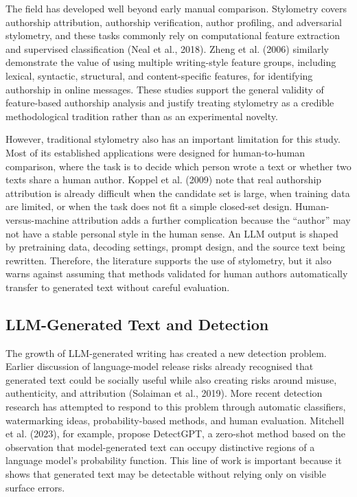 \documentclass[12pt,a4paper]{article}
\begin{document}
The field has developed well beyond early manual comparison. Stylometry covers authorship attribution, authorship verification, author profiling, and adversarial stylometry, and these tasks commonly rely on computational feature extraction and supervised classification (Neal et al., 2018). Zheng et al. (2006) similarly demonstrate the value of using multiple writing-style feature groups, including lexical, syntactic, structural, and content-specific features, for identifying authorship in online messages. These studies support the general validity of feature-based authorship analysis and justify treating stylometry as a credible methodological tradition rather than as an experimental novelty.

However, traditional stylometry also has an important limitation for this study. Most of its established applications were designed for human-to-human comparison, where the task is to decide which person wrote a text or whether two texts share a human author. Koppel et al. (2009) note that real authorship attribution is already difficult when the candidate set is large, when training data are limited, or when the task does not fit a simple closed-set design. Human-versus-machine attribution adds a further complication because the ``author'' may not have a stable personal style in the human sense. An LLM output is shaped by pretraining data, decoding settings, prompt design, and the source text being rewritten. Therefore, the literature supports the use of stylometry, but it also warns against assuming that methods validated for human authors automatically transfer to generated text without careful evaluation.

\subsection{LLM-Generated Text and Detection}

The growth of LLM-generated writing has created a new detection problem. Earlier discussion of language-model release risks already recognised that generated text could be socially useful while also creating risks around misuse, authenticity, and attribution (Solaiman et al., 2019). More recent detection research has attempted to respond to this problem through automatic classifiers, watermarking ideas, probability-based methods, and human evaluation. Mitchell et al. (2023), for example, propose DetectGPT, a zero-shot method based on the observation that model-generated text can occupy distinctive regions of a language model's probability function. This line of work is important because it shows that generated text may be detectable without relying only on visible surface errors.
\end{document}
